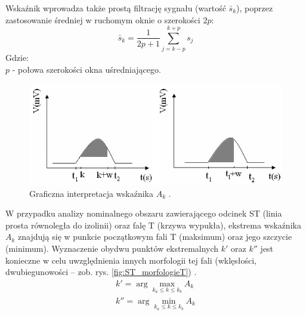 Wskaźnik wprowadza także prostą filtrację sygnału (wartość $ \bar{s}_k $), poprzez zastosowanie średniej w ruchomym oknie o szerokości $ 2p $:
\begin{equation}
	\bar{s}_k = \frac{1}{2p+1} \sum_{j=k-p}^{k+p} s_j
\end{equation}
Gdzie:\\
$ p $ - połowa szerokości okna uśredniającego.
\begin{figure}[H]
	\centering
	\includegraphics[width=1\textwidth]{ST_INTERVAL/img/ST_wskaznikAK.png}
	\caption{Graficzna interpretacja wskaźnika $ A_k $ \cite{STInt1}.}
	\label{fig:ST_wskaznikAK}
\end{figure}
W przypadku analizy nominalnego obszaru zawierającego odcinek ST (linia prosta równoległa do izolinii) oraz falę T (krzywa wypukła), ekstrema wskaźnika $ A_k $ znajdują się w punkcie początkowym fali T (maksimum) oraz jego szczycie (minimum). Wyznaczenie obydwu punktów ekstremalnych $ k' $ oraz $ k'' $ jest konieczne w celu uwzględnienia innych morfologii tej fali (wklęsłości, dwubiegunowości – zob. rys. \ref{fig:ST_morfologieT}) \cite{STInt1}.
\begin{subequations}
	\begin{align}
	k' = \arg \max_{k_a \leq k \leq k_b} A_k \\
	k'' = \arg \min_{k_a \leq k \leq k_b} A_k
	\end{align}
\end{subequations}

